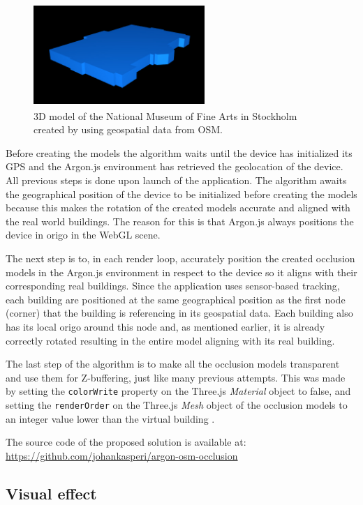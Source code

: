 \begin{figure}
\includegraphics[width=245px, height=147px]{_image_nationalmuseum3d}
\caption{3D model of the National Museum of Fine Arts in Stockholm created by using geospatial data from OSM.}
\label{fig:_image_nationalmuseum3d}
\end{figure}

Before creating the models the algorithm waits until the device has initialized its GPS and the Argon.js environment has retrieved the geolocation of the device. All previous steps is done upon launch of the application. The algorithm awaits the geographical position of the device to be initialized before creating the models because this makes the rotation of the created models accurate and aligned with the real world buildings. The reason for this is that Argon.js always positions the device in origo in the WebGL scene.

The next step is to, in each render loop, accurately position the created occlusion models in the Argon.js environment in respect to the device so it aligns with their corresponding real buildings. Since the application uses sensor-based tracking, each building are positioned at the same geographical position as the first node (corner) that the building is referencing in its geospatial data. Each building also has its local origo around this node and, as mentioned earlier, it is already correctly rotated resulting in the entire model aligning with its real building.

The last step of the algorithm is to make all the occlusion models transparent and use them for Z-buffering, just like many previous attempts. This was made by setting the \texttt{colorWrite} property on the Three.js \textit{Material} object to false, and setting the \texttt{renderOrder} on the Three.js \textit{Mesh} object of the occlusion models to an integer value lower than the virtual building \cite{threeMaterial, threeMesh}.

The source code of the proposed solution is available at: \url{https://github.com/johankasperi/argon-osm-occlusion}

\subsection{Visual effect}

